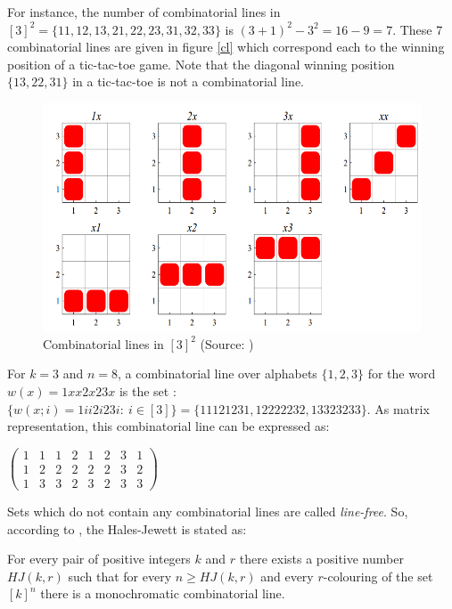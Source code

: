 For instance, the number of combinatorial lines in $[3]^2=\{11,12,13,21,22,23,31,32,33\}$ is $(3+1)^2-3^2=16-9=7.$ These 7 combinatorial lines are given in figure \eqref{cl} which correspond each to the winning position of a tic-tac-toe game. Note that the diagonal winning position $\{13, 22,31\}$ in a tic-tac-toe is not a combinatorial line.
\begin{figure}[hbtp]
\centering
\includegraphics[scale=0.3]{cblines.png}
\caption{Combinatorial lines in $[3]^2$ (Source: \cite{polymath2010density})} \label{cl}
\end{figure}

For $k=3$ and $n=8$, a combinatorial line over alphabets $\{1,2,3\}$ for the word  $w(x)=1xx2x23x$ is the set :
$\{w(x;i)=1ii2i23i: \ i\in [3]\}=  \{11121231, 12222232, 13323233 \}.$ As matrix representation, this combinatorial line can be expressed as:
\begin{center}
$\left(\begin{array}{cccccccc}
1 & 1 & 1 & 2 & 1 & 2& 3 &1\\  1 & 2 & 2 & 2 & 2 & 2 & 3 & 2\\ 1 & 3 & 3 & 2 & 3 & 2 & 3 & 3 
\end{array}  \right)$
\end{center}


Sets which do not contain any combinatorial lines are called  \textit{line-free}.  So, according to \cite{polymath2012new}, the Hales-Jewett is stated as:

\begin{thm}   For every pair of positive integers $k$ and $r$ there exists a positive number $HJ(k, r)$ such that for every $n \geq HJ(k, r)$ and every $r$-colouring of the set $[k]^n$ there is a
monochromatic combinatorial line.   \label{hj1} 	\end{thm}

